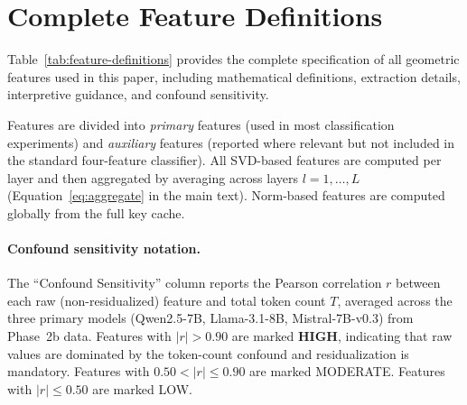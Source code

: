 
\section{Complete Feature Definitions}
\label{app:feature-definitions}

Table~\ref{tab:feature-definitions} provides the complete specification of all geometric features used in this paper, including mathematical definitions, extraction details, interpretive guidance, and confound sensitivity.

Features are divided into \emph{primary} features (used in most classification experiments) and \emph{auxiliary} features (reported where relevant but not included in the standard four-feature classifier).
All SVD-based features are computed per layer and then aggregated by averaging across layers $l = 1, \ldots, L$ (Equation~\ref{eq:aggregate} in the main text).
Norm-based features are computed globally from the full key cache.

\paragraph{Confound sensitivity notation.}
The ``Confound Sensitivity'' column reports the Pearson correlation $r$ between each raw (non-residualized) feature and total token count $T$, averaged across the three primary models (Qwen2.5-7B, Llama-3.1-8B, Mistral-7B-v0.3) from Phase~2b data.
Features with $|r| > 0.90$ are marked \textbf{HIGH}, indicating that raw values are dominated by the token-count confound and \fwl residualization is mandatory.
Features with $0.50 < |r| \leq 0.90$ are marked MODERATE.
Features with $|r| \leq 0.50$ are marked LOW.

